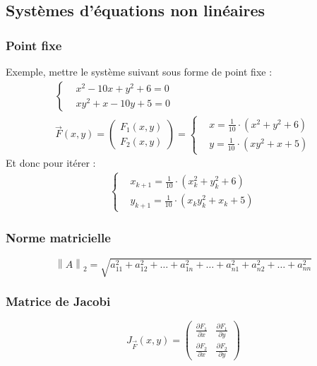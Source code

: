 \subsection*{Systèmes d'équations non linéaires}
\noindent
\subsubsection*{Point fixe}
\noindent
Exemple, mettre le système suivant sous forme de point fixe :
\begin{align*}
    \left\{
    \begin{aligned}
         & x^2-10x+y^2+6 = 0 \\
         & xy^2+x-10y+5 = 0
    \end{aligned}
    \right. \\
    \overrightarrow{F}(x,y) = \begin{pmatrix} F_1(x,y) \\ F_2(x,y) \end{pmatrix} =
    \left\{
    \begin{aligned}
         & x = \frac{1}{10}\cdot (x^2+y^2+6) \\
         & y = \frac{1}{10}\cdot (xy^2+x+5)
    \end{aligned}
    \right.
\end{align*}
Et donc pour itérer :
\begin{align}
    \left\{
    \begin{aligned}
         & x_{k+1} = \frac{1}{10}\cdot (x_k^2+y_k^2+6)  \\
         & y_{k+1} = \frac{1}{10}\cdot (x_ky_k^2+x_k+5)
    \end{aligned}
    \right.
    \nonumber
\end{align}
\subsubsection*{Norme matricielle}
\noindent
\begin{equation}
    \left\|A\right\|_2 = \sqrt{a_{11}^2+a_{12}^2+\dots+a_{1n}^2+\dots+a_{n1}^2+a_{n2}^2+\dots+a_{nn}^2}
    \nonumber
\end{equation}
\subsubsection*{Matrice de Jacobi}
\noindent
\begin{equation}
    J_{\overrightarrow{F}}(x,y) =
    \begin{pmatrix}
        \frac{\partial F_1}{\partial x} & \frac{\partial F_1}{\partial y} \\
        \frac{\partial F_2}{\partial x} & \frac{\partial F_2}{\partial y}
    \end{pmatrix}
    \nonumber
\end{equation}
